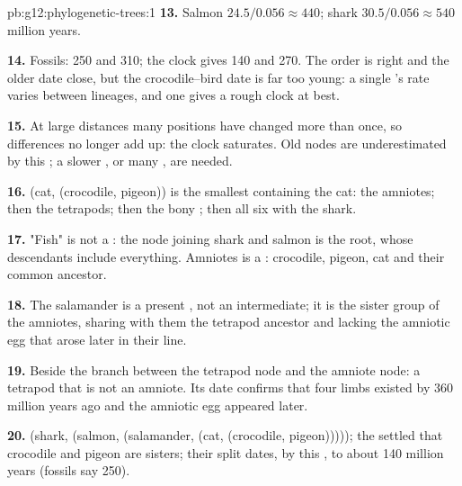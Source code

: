 \begin{solution}{pb:g12:phylogenetic-trees:1}
\textbf{13.} Salmon $24.5/0.056 \approx 440$; shark $30.5/0.056
\approx 540$ million years.

\textbf{14.} Fossils: 250 and 310; the clock gives 140 and 270. The
order is right and the older date close, but the crocodile--bird date
is far too young: a single 's rate varies between lineages, and
one  gives a rough clock at best.

\textbf{15.} At large distances many positions have changed more than
once, so differences no longer add up: the clock saturates. Old nodes
are underestimated by this ; a slower , or many , are
needed.

\textbf{16.} (cat, (crocodile, pigeon)) is the smallest 
containing the cat: the amniotes; then the tetrapods; then the bony
; then all six with the shark.

\textbf{17.} "Fish" is not a : the node joining shark and salmon
is the root, whose descendants include everything. Amniotes is a
: crocodile, pigeon, cat and their common ancestor.

\textbf{18.} The salamander is a present , not an intermediate;
it is the sister group of the amniotes, sharing with them the tetrapod
ancestor and lacking the amniotic egg that arose later in their line.

\textbf{19.} Beside the branch between the tetrapod node and the
amniote node: a tetrapod that is not an amniote. Its date confirms
that four limbs existed by 360 million years ago and the amniotic egg
appeared later.

\textbf{20.} (shark, (salmon, (salamander, (cat, (crocodile,
pigeon))))); the  settled that crocodile and pigeon are sisters;
their split dates, by this , to about 140 million years (fossils
say 250).
\end{solution}
